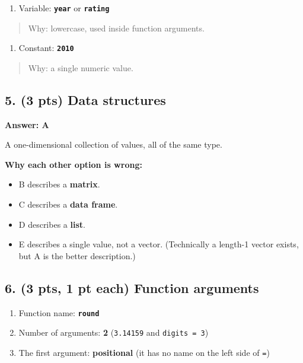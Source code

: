 \documentclass[
  11pt,
  letterpaper,
  DIV=11,
  numbers=noendperiod]{scrartcl}
\providecommand{\tightlist}{%
  \setlength{\itemsep}{0pt}\setlength{\parskip}{0pt}}
\begin{document}
\begin{enumerate}
\def\labelenumi{(\alph{enumi})}
\setcounter{enumi}{2}
\item Variable: \textbf{\texttt{year}} or \textbf{\texttt{rating}}
\end{enumerate}

\begin{quote}
Why: lowercase, used inside function arguments.
\end{quote}

\begin{enumerate}
\def\labelenumi{(\alph{enumi})}
\setcounter{enumi}{3}
\item Constant: \textbf{\texttt{2010}}
\end{enumerate}

\begin{quote}
Why: a single numeric value.
\end{quote}

\hrulefill

\subsection{5. (3 pts) Data structures}

\textbf{Answer: A}

A one-dimensional collection of values, all of the same type.

\textbf{Why each other option is wrong:}

\begin{itemize}
\tightlist
\item B describes a \textbf{matrix}.
\item C describes a \textbf{data frame}.
\item D describes a \textbf{list}.
\item E describes a single value, not a vector. (Technically a length-1 vector exists, but A is the better description.)
\end{itemize}

\hrulefill

\subsection{6. (3 pts, 1 pt each) Function arguments}

\begin{enumerate}
\def\labelenumi{(\alph{enumi})}
\item Function name: \textbf{\texttt{round}}
\item Number of arguments: \textbf{2} (\texttt{3.14159} and \texttt{digits\ =\ 3})
\item The first argument: \textbf{positional} (it has no name on the left side of \texttt{=})
\end{enumerate}
\end{document}
